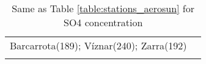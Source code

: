 \documentclass[journal abbreviation, manuscript]{copernicus}
\begin{document}
\begin{table}
\begin{tabularx}{\textwidth}{lX}
                                                                                                                                                                                                                                                                                                                                                                                                                                                                                                                                                                                                                                                                                                                                                                                                                                                                                                                                                                                                                                                                                                                                                                                                                                                                                                                                                                                                                                                                                                                                                                                                                                                                                                                                                                                                                                                                                                                                                                                                                                                                                                                                                              Barcarrota(189); Víznar(240); Zarra(192) \\
\bottomhline
 \end{tabularx}
 \caption{Same as Table \ref{table:stations_aerosun} for SO4 concentration}
 \label{table:stations_so4}
\end{table}

\clearpage
\end{document}
